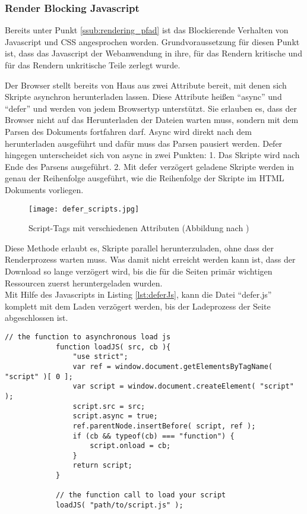 		\subsubsection{Render Blocking Javascript} %
		\label{ssub:render_blocking_javascript}
			Bereits unter Punkt \ref{ssub:rendering_pfad} ist das Blockierende Verhalten von Javascript und CSS angesprochen worden. Grundvoraussetzung für diesen Punkt ist, dass das Javascript der Webanwendung in ihre, für das Rendern kritische und für das Rendern unkritische Teile zerlegt wurde. 

			Der Browser stellt bereits von Haus aus zwei Attribute bereit, mit denen sich Skripte asynchron herunterladen lassen. Diese Attribute heißen "`async"' und "`defer"' und werden von jedem Browsertyp unterstützt.\autocite{canIuse} Sie erlauben es, dass der Browser nicht auf das Herunterladen der Dateien warten muss, sondern mit dem Parsen des Dokuments fortfahren darf. Async wird direkt nach dem herunterladen ausgeführt und dafür muss das Parsen pausiert werden. Defer hingegen unterscheidet sich von async in zwei Punkten: 1. Das Skripte wird nach Ende des Parsens ausgeführt. 2. Mit defer verzögert geladene Skripte werden in genau der Reihenfolge ausgeführt, wie die Reihenfolge der Skripte im HTML Dokuments vorliegen.
			
			\begin{figure}[htbp]
				\begin{center}
					\texttt{[image: defer\_scripts.jpg]}
					\caption{Script-Tags mit verschiedenen Attributen (Abbildung nach \autocite{growing})}
					\label{fig:defer_scripts}
				\end{center}
			\end{figure}

			Diese Methode erlaubt es, Skripte parallel herunterzuladen, ohne dass der Renderprozess warten muss. Was damit nicht erreicht werden kann ist, dass der Download so lange verzögert wird, bis die für die Seiten primär wichtigen Ressourcen zuerst heruntergeladen wurden.\\

			Mit Hilfe des Javascripts in Listing \ref{lst:deferJs}, kann die Datei "`defer.js"' komplett mit dem Laden verzögert werden, bis der Ladeprozess der Seite abgeschlossen ist.\\
	
			\begin{lstlisting}[captionpos=b, caption=Javascript nach \autocite{deferJS}, label=lst:deferJs]
			// the function to asynchronous load js
			function loadJS( src, cb ){
				"use strict";
				var ref = window.document.getElementsByTagName( "script" )[ 0 ];
				var script = window.document.createElement( "script" );
				script.src = src;
				script.async = true;
				ref.parentNode.insertBefore( script, ref );
				if (cb && typeof(cb) === "function") {
					script.onload = cb;
				}
				return script;
			}

			// the function call to load your script
			loadJS( "path/to/script.js" );
			\end{lstlisting}

